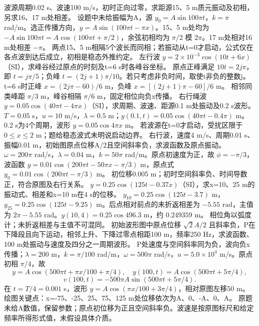 \problemtext 波源周期0.02 s、波速100 m/s，初时正向过零，求距源15、5 m质元振动及初相，另求16、17 m处相差。
\workings 设题中未给振幅为A，源 $y_0=A\sin100\pi t$，$k=\pi$ rad/m。选正传播方向，$y=A\sin(100\pi t-\pi x)$。15、5 m处均为 $-A\sin100\pi t=A\cos(100\pi t+\pi/2)$，余弦初相均为 $\pi/2$ 模 $2\pi$。17 m处相对16 m处相差 $-\pi$。
\crosscheck 两点15、5 m相隔5个波长而同相；若振动从t=0才启动，公式仅在各点波到达后成立，初相是稳态外推约定。
\problemtext 左行波 $y=2\times10^{-3}\cos(10t+6x)$（SI），求峰谷经过原点的时刻及t=6 s时各峰谷坐标。
\workings 原点正峰满足 $10t=2j\pi$，即 $t=j\pi/5$；负峰 $t=(2j+1)\pi/10$。若只考虑非负时间，取使t非负的整数j。t=6 s时正峰 $x=(2j\pi-60)/6$ m，负峰 $x=[(2j+1)\pi-60]/6$ m。
\crosscheck 相邻同类峰距 $\pi/3$ m，峰谷相隔 $\pi/6$ m，固定相位向负x传播。
\problemtext 右行绳波 $y=0.05\cos(40\pi t-4\pi x)$（SI），求周期、波速、距源0.1 m处振动及0.2 s波形。
\workings $T=0.05$ s，$u=10$ m/s，$\lambda=0.5$ m；$y(0.1,t)=0.05\cos(40\pi t-0.4\pi)$ m。0.2 s为4个周期，波形 $y=0.05\cos4\pi x$ m。
\crosscheck 若波源在t=0才启动，受扰区限于 $0\le x\le2$ m；题给稳态波式未明说启动边界。
\problemtext 右行波，速度4 m/s、周期0.01 s、振幅0.01 m，初始图原点位移A/2且空间斜率负，求波函数及原点振动。
\workings $\omega=200\pi$ rad/s，$\lambda=0.04$ m，$k=50\pi$ rad/m。原点初速度为正，故 $\phi=-\pi/3$，波函数 $y=0.01\cos(200\pi t-50\pi x-\pi/3)$ m，原点式 $y_0=0.01\cos(200\pi t-\pi/3)$ m。
\crosscheck 初位移0.005 m；初时空间斜率负、时间导数正，符合原图及右行关系。
\problemtext $y=0.25\cos(125t-0.37x)$（SI），求x=10、25 m的振动式、相差和x=10 m在4 s的位移。
\workings $y_{10}=0.25\cos(125t-3.7)$ m，$y_{25}=0.25\cos(125t-9.25)$ m。后点相对前点的未折返相差为 $-5.55$ rad，主值为 $2\pi-5.55$ rad。$y(10,4)=0.25\cos496.3$ m，约 $0.249359$ m。
\crosscheck 相位角以弧度计；未折返相差与主值不可混同。
\problemtext 初始波形图中原点位移 $\sqrt2 A/2$ 且斜率负，P在下降段且向下运动，相邻上升、下降过零点相距100 m，频率250 Hz，求波函数、100 m处振动与速度及四分之一周期波形。
\workings P处速度与空间斜率同为负，波向负x传播；$\lambda=200$ m，$k=\pi/100$ rad/m，$\omega=500\pi$ rad/s，$u=5.0\times10^4$ m/s。原点初相 $\pi/4$，故
\[
y=A\cos(500\pi t+\pi x/100+\pi/4),\quad
y(100,t)=A\cos(500\pi t+5\pi/4),
\]
\[
v(100,t)=-500\pi A\sin(500\pi t+5\pi/4).
\]
在 $t=T/4=0.001$ s，波形 $y=A\cos(\pi x/100+3\pi/4)$，相对原图左移50 m。绘图关键点：x=-75、-25、25、75、125 m处位移依次为A、0、-A、0、A。
\crosscheck 原题未给A数值，保留参数；原点初位移为正且空间斜率负。波速是按原图标尺和给定频率所得形式值，未假设具体介质。

